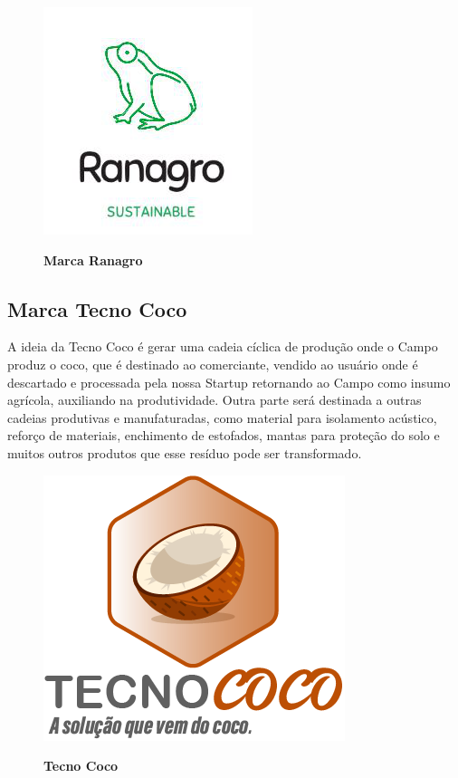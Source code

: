 \begin{figure}[H]
\centering
\caption{\textbf{Marca Ranagro}}
\includegraphics[scale=1]{Imagens/ranagro.png}
\label{figura_26}
\end{figure}


\subsection{Marca Tecno Coco}

A ideia da Tecno Coco é gerar uma cadeia cíclica de produção onde o Campo produz o coco, que é destinado ao comerciante, vendido ao usuário onde é descartado e processada pela nossa Startup retornando ao Campo como insumo agrícola, auxiliando na produtividade. Outra parte será destinada a outras cadeias produtivas e manufaturadas, como material para isolamento acústico, reforço de materiais, enchimento de estofados, mantas para proteção do solo e muitos outros produtos que esse resíduo pode ser transformado. 

\begin{figure}[H]
\centering
\caption{\textbf{Tecno Coco}}
\includegraphics[scale=2]{Imagens/tecnococo.png}
\label{tecno_coco}
\end{figure}


